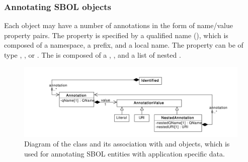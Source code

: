 \subsubsection{Annotating SBOL objects}
\label{sec:value}
\label{sec:Annotation}
\label{sec:AnnotationValue}
\label{sec:ListOfAnnotations}

Each  object may have a number of annotations in the form of name/value property pairs. The  property is specified by a qualified name (), which is composed of a namespace, a prefix, and a local name. The  property can be of type , , or . The  is composed of a , , and a list of nested .


\begin{figure}[!ht]
\begin{center}
\includegraphics[scale=0.6]{uml/identified_annotations}
\caption[]{Diagram of the  class and its association with  and  objects, which is used for annotating SBOL entities with application specific data.}
\label{uml:identified_annotations}
\end{center}
\end{figure}

